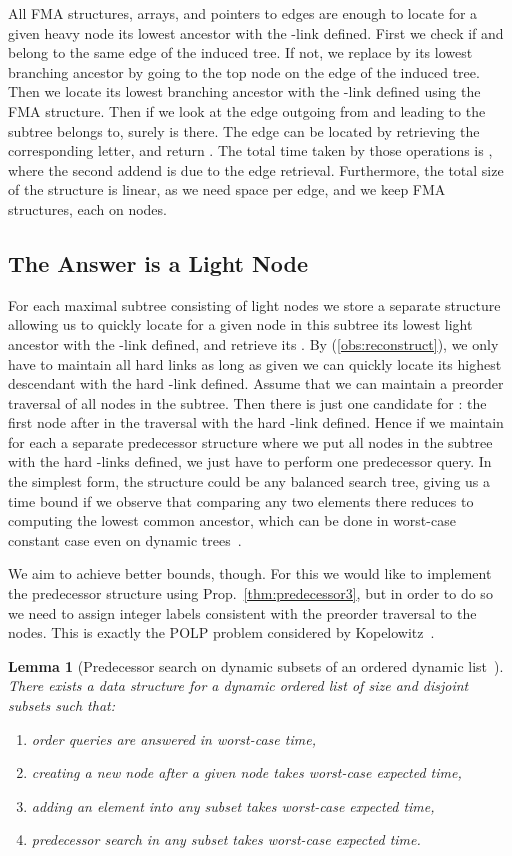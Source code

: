 \documentclass[11pt,onecolumn,final]{article} \usepackage{a4}
\theoremstyle{plain}
\newtheorem{lemma}[definition]{Lemma}
\theoremstyle{remark}
\begin{document}
All FMA structures, arrays, and pointers to edges are enough to locate for a given heavy node  its lowest ancestor  with the -link defined. First we check if  and  belong to the same edge of the induced tree. If not, we replace  by its lowest branching ancestor  by going to the top node on the edge of the induced tree. Then we locate its lowest branching ancestor  with the -link defined using the FMA structure. Then if we look at the edge outgoing from  and leading to the subtree  belongs to,  surely is there.
The edge can be located by retrieving the corresponding letter, and return . The total time taken by those operations is , where the second addend is due to the edge retrieval. Furthermore, the total size of the structure is linear, as we need  space per edge, and we keep  FMA structures, each on  nodes.

\subsection{The Answer is a Light Node}
For each maximal subtree consisting of light nodes we store a separate structure allowing us to quickly locate for a given node  in this subtree its lowest light ancestor  with the -link defined, and retrieve its . By (\ref{obs:reconstruct}), we only have to maintain all hard links as long as given  we can quickly locate its highest descendant  with the hard -link defined. Assume that we can maintain a preorder traversal of all nodes in the subtree. Then there is just one candidate for :
the first node after  in the traversal with the hard -link defined. Hence if we maintain for each  a separate predecessor structure where we put all nodes in the subtree with the hard -links defined, we just have to perform one predecessor query. In the simplest form, the structure could be any balanced search tree, giving us a  time bound if we observe that comparing any two elements there reduces to computing the lowest common ancestor, which can be done in worst-case constant case even on dynamic trees~\cite{cole05dynamic}.

We aim to achieve better bounds, though. For this we would like to implement the predecessor structure using Prop.~\ref{thm:predecessor3}, but in order to do so we need to assign integer labels consistent with the preorder traversal to the nodes. This is exactly the POLP problem considered by Kopelowitz~\cite{Kopelot12indexing}. 

\begin{lemma}[Predecessor search on dynamic subsets of an ordered dynamic list~\cite{Kopelot12indexing}]
There exists a data structure for a dynamic ordered list of size  and disjoint subsets such that:
\begin{enumerate}
\item order queries are answered in  worst-case time,
\item creating a new node after a given node takes  worst-case expected time,
\item adding an element into any subset takes  worst-case expected time,
\item predecessor search in any subset takes  worst-case expected time.
\end{enumerate}
\end{lemma}
\end{document}
